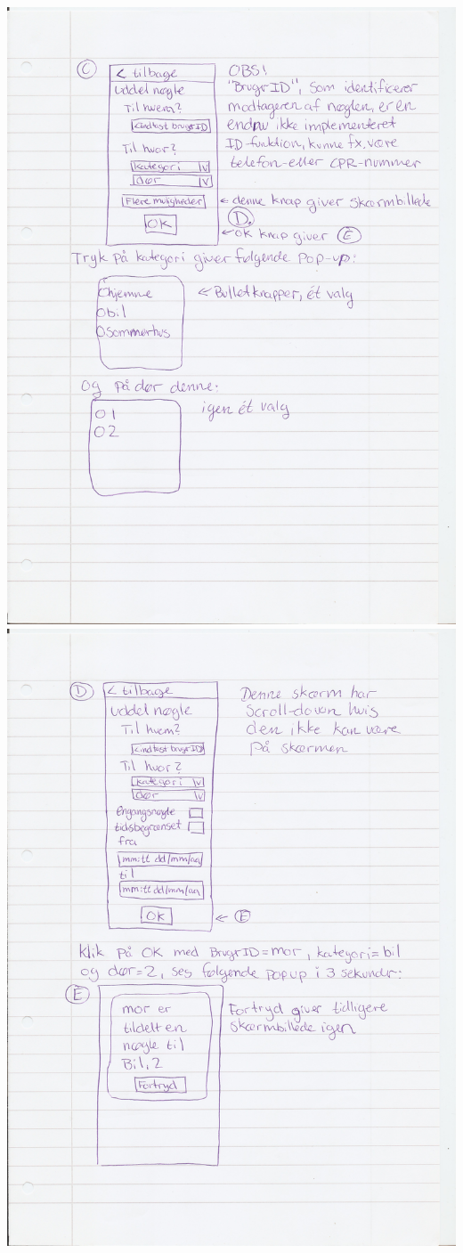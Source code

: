 \documentclass[a4paper,12pt]{article}
\begin{document}
\includegraphics[width=\textwidth]{proto/C.jpg}
\includegraphics[width=\textwidth]{proto/DE.jpg}
\end{document}
